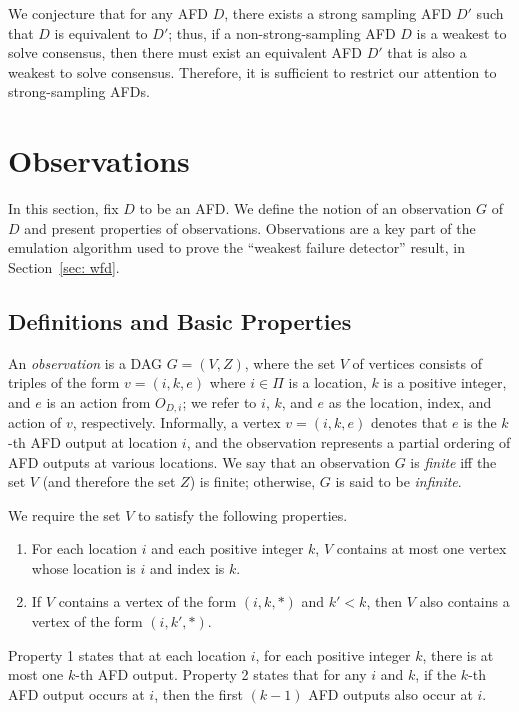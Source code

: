 \documentclass[11pt]{article}
\numberwithin{theorem}{section}
\newcommand{\FD}{D}
\begin{document}
We conjecture that for any AFD $D$, there exists a strong sampling AFD $D'$ such that $D$ is equivalent to $D'$; thus, if a non-strong-sampling AFD $D$ is a weakest to solve consensus, then there must exist an equivalent AFD $D'$ that is also a weakest to solve consensus. Therefore, it is sufficient to restrict our attention to strong-sampling AFDs.



\section{Observations}\label{sec:observations}



In this section, fix $\FD$ to be an AFD.
We define the notion of an observation $G$ of $D$ and present
properties of observations.
Observations are a key part of the emulation algorithm used to prove
the ``weakest failure detector'' result, in Section~\ref{sec: wfd}.



\subsection{Definitions and Basic Properties}
\label{subsec:observationDef}

An \emph{observation} is a DAG $G = (V,Z)$, where the set $V$ of
vertices consists of triples of the form $v = (i,k,e)$ where $i \in
\Pi$ is a location, $k$ is a positive integer, and $e$ is an action
from $O_{D,i}$; we refer to $i$, $k$, and $e$ as the location, index,
and action of $v$, respectively. 
Informally, a vertex $v = (i,k,e)$ denotes that $e$ is the $k$-th AFD
output at location $i$, and the observation represents a partial
ordering of AFD outputs at various locations. 
We say that an observation $G$ is \emph{finite} iff the set $V$ (and therefore the set $Z$) is finite; otherwise, $G$ is said to be \emph{infinite}.

We require the set $V$ to satisfy the following properties.
\begin{enumerate}
\item 
For each location $i$ and each positive integer $k$, $V$ contains at
most one vertex whose location is $i$ and index is $k$.
\item 
If $V$ contains a vertex of the form $(i,k,*)$ and $k'<k$, then $V$
also contains a vertex of the form $(i,k',*)$.
\end{enumerate}
Property 1 states that at each location $i$, for each positive integer $k$, there is at most
one $k$-th AFD output. 
Property 2 states that for any $i$ and $k$, if the $k$-th AFD output occurs at $i$,
then the first $(k-1)$ AFD outputs also occur at $i$.
\end{document}
